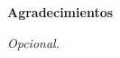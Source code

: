 \cleardoublepage

\thispagestyle{empty}


\begin{center}
{\bf \Huge Agradecimientos}
\end{center}
\vspace{1cm}
\setlength{\baselineskip}{0.8cm}

\begin{flushright}
\textit{Opcional.}
\end{flushright}

